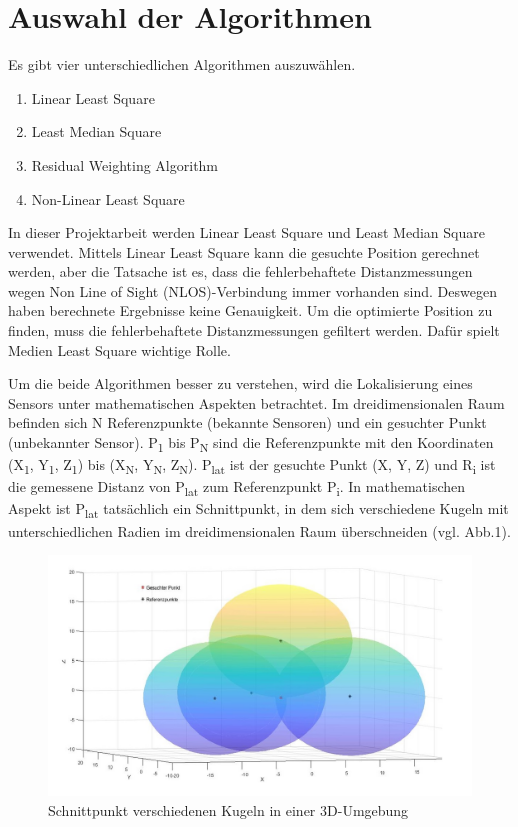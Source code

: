 \section{Auswahl der Algorithmen}

Es gibt vier unterschiedlichen Algorithmen auszuwählen.
\begin{enumerate}
	\item Linear Least Square
	\item Least Median Square 
	\item Residual Weighting Algorithm
	\item Non-Linear Least Square
\end{enumerate} 

In dieser Projektarbeit werden Linear Least Square und Least Median Square verwendet. Mittels Linear Least Square kann die gesuchte Position gerechnet werden, aber die Tatsache ist es, dass die fehlerbehaftete Distanzmessungen wegen Non Line of Sight (NLOS)-Verbindung immer vorhanden sind. Deswegen haben berechnete Ergebnisse keine Genauigkeit. Um die optimierte Position zu finden, muss die fehlerbehaftete Distanzmessungen gefiltert werden. Dafür spielt Medien Least Square wichtige Rolle.

Um die beide Algorithmen besser zu verstehen, wird die Lokalisierung eines Sensors unter mathematischen Aspekten betrachtet. Im dreidimensionalen Raum befinden sich N Referenzpunkte (bekannte Sensoren) und ein gesuchter Punkt (unbekannter Sensor). P\textsubscript{1} bis P\textsubscript{N} sind die Referenzpunkte mit den Koordinaten (X\textsubscript{1}, Y\textsubscript{1}, Z\textsubscript{1}) bis (X\textsubscript{N}, Y\textsubscript{N}, Z\textsubscript{N}). P\textsubscript{lat} ist der gesuchte Punkt (X, Y, Z) und R\textsubscript{i} ist die gemessene Distanz von P\textsubscript{lat} zum Referenzpunkt P\textsubscript{i}. In mathematischen Aspekt ist P\textsubscript{lat} tatsächlich ein Schnittpunkt, in dem sich verschiedene Kugeln mit unterschiedlichen Radien im dreidimensionalen Raum überschneiden (vgl. Abb.1). 

\begin{figure}[H]
	\centering
	\includegraphics[scale=0.36]{img/Schnittpunkt_3D.jpg}
	\caption{Schnittpunkt verschiedenen Kugeln in einer 3D-Umgebung}
\end{figure}

